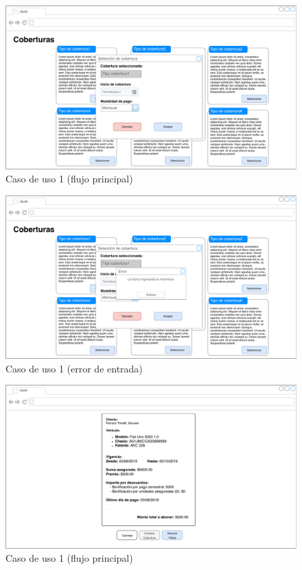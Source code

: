 \documentclass[12pt]{article}
\begin{document}
\vfill
\begin{figure}[h!]
\includegraphics[width=\textwidth]{CU1/CU-014.pdf}
\caption{Caso de uso 1 (flujo principal)}
\end{figure}
\vfill

\vfill
\begin{figure}[h!]
\includegraphics[width=\textwidth]{CU1/CU-015.pdf}
\caption{Caso de uso 1 (error de entrada)}
\end{figure}
\vfill

\vfill
\begin{figure}[h!]
\includegraphics[width=\textwidth]{CU1/CU-016.pdf}
\caption{Caso de uso 1 (flujo principal)}
\end{figure}
\vfill
\end{document}
